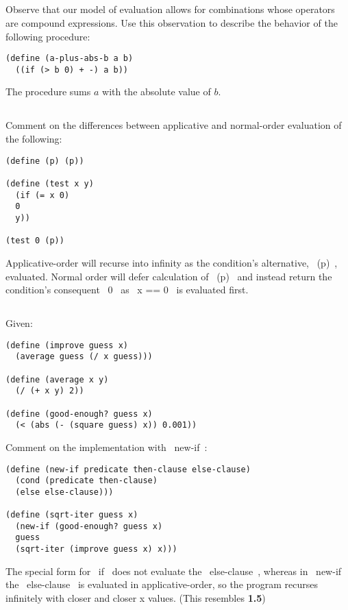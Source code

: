 \documentclass{article}
\begin{document}
\pagebreak
\subsection{}
Observe that our model of evaluation allows for combinations whose operators are compound expressions. Use this observation to describe the behavior of the following procedure:
\begin{lstlisting}
(define (a-plus-abs-b a b)
  ((if (> b 0) + -) a b))
\end{lstlisting}
The procedure sums $a$ with the absolute value of $b$.

\subsection{}
Comment on the differences between applicative and normal-order evaluation of the following:
\begin{lstlisting}
(define (p) (p))

(define (test x y)
  (if (= x 0)
  0
  y))

(test 0 (p))
\end{lstlisting}
Applicative-order will recurse into infinity as the condition's alternative, ~(p)~, evaluated. Normal order will defer calculation of ~(p)~ and instead return the condition's consequent ~0~ as ~x == 0~ is evaluated first.

\subsection{}
Given:
\begin{lstlisting}
(define (improve guess x)
  (average guess (/ x guess)))

(define (average x y)
  (/ (+ x y) 2))

(define (good-enough? guess x)
  (< (abs (- (square guess) x)) 0.001))
\end{lstlisting}
Comment on the implementation with ~new-if~:
\begin{lstlisting}
(define (new-if predicate then-clause else-clause)
  (cond (predicate then-clause)
  (else else-clause)))

(define (sqrt-iter guess x)
  (new-if (good-enough? guess x)
  guess
  (sqrt-iter (improve guess x) x)))
\end{lstlisting}
The special form for ~if~ does not evaluate the ~else-clause~, whereas in ~new-if~ the ~else-clause~ is evaluated in applicative-order, so the program recurses infinitely with closer and closer x values. (This resembles \textbf{1.5})
\end{document}
